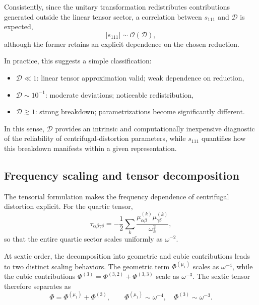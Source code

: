 \documentclass[aip,jcp,reprint,floatfix]{revtex4-2}
\begin{document}
Consistently, since the unitary transformation redistributes
contributions generated outside the linear tensor sector, a correlation
between $s_{111}$ and $\mathcal{D}$ is expected,
\begin{equation}
|s_{111}| \sim \mathcal{O}(\mathcal{D}),
\end{equation}
although the former retains an explicit dependence on the chosen
reduction.

In practice, this suggests a simple classification:
\begin{itemize}
\item $\mathcal{D} \ll 1$: linear tensor approximation valid; weak dependence on reduction,
\item $\mathcal{D} \sim 10^{-1}$: moderate deviations; noticeable redistribution,
\item $\mathcal{D} \gtrsim 1$: strong breakdown; parametrizations become significantly different.
\end{itemize}

In this sense, $\mathcal{D}$ provides an intrinsic and computationally
inexpensive diagnostic of the reliability of centrifugal-distortion
parameters, while $s_{111}$ quantifies how this breakdown manifests
within a given representation.


\subsection{Frequency scaling and tensor decomposition}

The tensorial formulation makes the frequency dependence of
centrifugal distortion explicit. For the quartic tensor,
\begin{equation}
\tau_{\alpha\beta\gamma\delta}
=
-\frac{1}{2}\sum_k
\frac{\mu^{(k)}_{\alpha\beta}\mu^{(k)}_{\gamma\delta}}{\omega_k^2},
\end{equation}
so that the entire quartic sector scales uniformly as $\omega^{-2}$.

At sextic order, the decomposition into geometric and cubic
contributions leads to two distinct scaling behaviors. The geometric
term $\Phi^{(\mu_1)}$ scales as $\omega^{-4}$, while the cubic
contributions $\Phi^{(3)}=\Phi^{(3,2)}+\Phi^{(3,3)}$ scale as
$\omega^{-3}$. The sextic tensor therefore separates as
\begin{equation}
\Phi = \Phi^{(\mu_1)} + \Phi^{(3)},
\qquad
\Phi^{(\mu_1)} \sim \omega^{-4},
\quad
\Phi^{(3)} \sim \omega^{-3}.
\end{equation}
\end{document}
